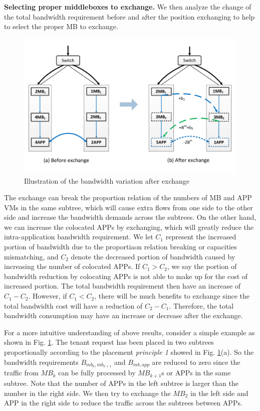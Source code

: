 \documentclass[review]{elsarticle}
\begin{document}
\textbf{Selecting proper middleboxes to exchange.} 
We then analyze the change of the total bandwidth requirement before and after the position exchanging to help to select the proper MB to exchange.%
\begin{figure}
	\centering
	\includegraphics[width=4.5in]{fig/exchange_example.pdf}
	\caption{Illustration of the bandwidth variation after exchange}
    \label{fig:exchange}
\end{figure}
The exchange can break the proportion relation of the numbers of MB and APP VMs in the same subtree, which will cause extra flows from one side to the other side and increase the bandwidth demands across the subtrees. On the other hand, we can increase the colocated APPs by exchanging, which will greatly reduce the intra-application bandwidth requirement. We let $C_1$ represent the increased portion of bandwidth due to the proportiaon relation breaking or capacities mismatching, and $C_2$ denote the decreased portion of bandwidth caused by increasing the number of colocated APPs. If $C_1>C_2$, we say the portion of bandwidth reduction by colocating APPs is not able to make up for the cost of increased portion. The total bandwidth requirement then have an increase of $C_1-C_2$. However, if $C_1<C_2$, there will be much benefits to exchange since the total bandwidth cost will have a reduction of $C_2-C_1$. Therefore, the total bandwidth consumption may have an increase or decrease after the exchange.

For a more intuitive understanding of above results, consider a simple example as shown in Fig. \ref{fig:exchange}. The tenant request has been placed in two subtrees proportionally according to the placement \emph{principle 1} showed in Fig. \ref{fig:exchange}(a). So the bandwidth requirements $B_{mb_k,mb_{k+1}}$ and $B_{mb,app}$ are reduced to zero since the traffic from $MB_k$ can be fully processed by $MB_{k+1}$s or APPs in the same subtree. Note that the number of APPs in the left subtree is larger than the number in the right side. We then try to exchange the $MB_2$ in the left side and APP in the right side to reduce the traffic across the subtrees between APPs. 
\end{document}
